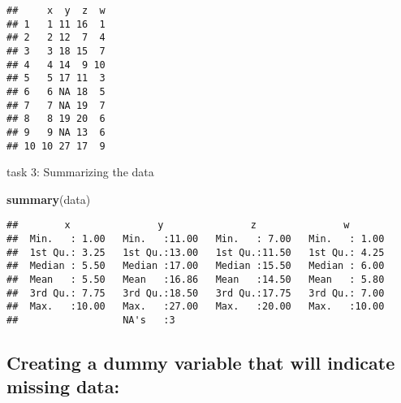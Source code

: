 \documentclass[
]{article}
\newenvironment{Shaded}{\begin{snugshade}}{\end{snugshade}}
\newcommand{\ControlFlowTok}[1]{\textcolor[rgb]{0.13,0.29,0.53}{\textbf{#1}}}
\newcommand{\DecValTok}[1]{\textcolor[rgb]{0.00,0.00,0.81}{#1}}
\newcommand{\FunctionTok}[1]{\textcolor[rgb]{0.13,0.29,0.53}{\textbf{#1}}}
\newcommand{\NormalTok}[1]{#1}
\newcommand{\OtherTok}[1]{\textcolor[rgb]{0.56,0.35,0.01}{#1}}
\newcommand{\SpecialCharTok}[1]{\textcolor[rgb]{0.81,0.36,0.00}{\textbf{#1}}}
\begin{document}
\begin{verbatim}
##     x  y  z  w
## 1   1 11 16  1
## 2   2 12  7  4
## 3   3 18 15  7
## 4   4 14  9 10
## 5   5 17 11  3
## 6   6 NA 18  5
## 7   7 NA 19  7
## 8   8 19 20  6
## 9   9 NA 13  6
## 10 10 27 17  9
\end{verbatim}

task 3: Summarizing the data

\begin{Shaded}
\begin{Highlighting}[]
\FunctionTok{summary}\NormalTok{(data) }
\end{Highlighting}
\end{Shaded}

\begin{verbatim}
##        x               y               z               w        
##  Min.   : 1.00   Min.   :11.00   Min.   : 7.00   Min.   : 1.00  
##  1st Qu.: 3.25   1st Qu.:13.00   1st Qu.:11.50   1st Qu.: 4.25  
##  Median : 5.50   Median :17.00   Median :15.50   Median : 6.00  
##  Mean   : 5.50   Mean   :16.86   Mean   :14.50   Mean   : 5.80  
##  3rd Qu.: 7.75   3rd Qu.:18.50   3rd Qu.:17.75   3rd Qu.: 7.00  
##  Max.   :10.00   Max.   :27.00   Max.   :20.00   Max.   :10.00  
##                  NA's   :3
\end{verbatim}

\hypertarget{creating-a-dummy-variable-that-will-indicate-missing-data}{%
\subsection{Creating a dummy variable that will indicate missing
data:}\label{creating-a-dummy-variable-that-will-indicate-missing-data}}

\begin{Shaded}
\end{Shaded}
\end{document}
